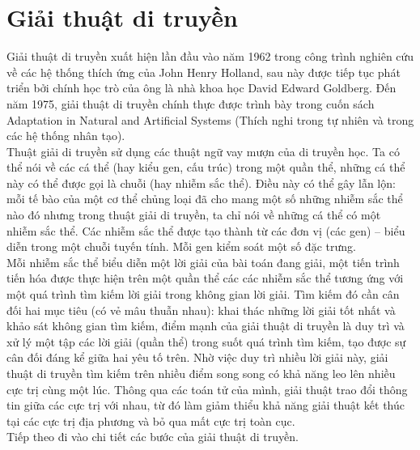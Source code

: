 \section{Giải thuật di truyền}
Giải thuật di truyền \cite{lap_trinh_tien_hoa} xuất hiện lần đầu vào năm 1962 trong công trình nghiên cứu về các hệ thống thích ứng của John Henry Holland, sau này được tiếp tục phát triển bởi chính học trò của ông là nhà khoa học David Edward Goldberg. Đến năm 1975, giải thuật di truyền chính thực được trình bày trong cuốn sách Adaptation in Natural and Artificial Systems (Thích nghi trong tự nhiên và trong các hệ thống nhân tạo).
\\Thuật giải di truyền sử dụng các thuật ngữ vay mượn của di truyền học. Ta có thể nói về các cá thể (hay kiểu gen, cấu trúc) trong một quần thể, những cá thể này có thể được gọi là chuỗi (hay nhiễm sắc thể). Điều này có thể gây lẫn lộn: mỗi tế bào của một cơ thể chủng loại đã cho mang một số những nhiễm sắc thể nào đó nhưng trong thuật giải di truyền, ta chỉ nói về những cá thể có một nhiễm sắc thể. Các nhiễm sắc thể được tạo thành từ các đơn vị (các gen) – biểu diễn trong một chuỗi tuyến tính. Mỗi gen kiểm soát một số đặc trưng.
\\Mỗi nhiễm sắc thể biểu diễn một lời giải của bài toán đang giải, một tiến trình tiến hóa được thực hiện trên một quần thể các các nhiễm sắc thể tương ứng với một quá trình tìm kiếm lời giải trong không gian lời giải. Tìm kiếm đó cần cân đối hai mục tiêu (có vẻ mâu thuẫn nhau): khai thác những lời giải tốt nhất và khảo sát không gian tìm kiếm, điểm mạnh của giải thuật di truyền là duy trì và xử lý một tập các lời giải (quần thể) trong suốt quá trình tìm kiếm, tạo được sự cân đối đáng kể giữa hai yêu tố trên. Nhờ việc duy trì nhiều lời giải này, giải thuật di truyền tìm kiếm trên nhiều điểm song song có khả năng leo lên nhiều cực trị cùng một lúc. Thông qua các toán tử của mình, giải thuật trao đổi thông tin giữa các cực trị với nhau, từ đó làm giảm thiểu khả năng giải thuật kết thúc tại các cực trị địa phương và bỏ qua mất cực trị toàn cục.
\\Tiếp theo đi vào chi tiết các bước của giải thuật di truyền.

